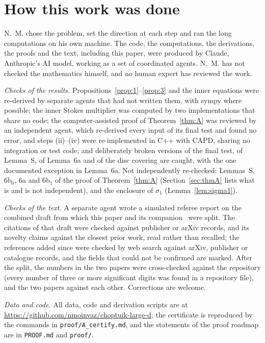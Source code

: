 \documentclass{amsart}
\numberwithin{equation}{section}
\theoremstyle{plain}
\theoremstyle{definition}
\theoremstyle{remark}
\newcommand{\repo}[1]{\texttt{#1}}
\begin{document}
\section*{How this work was done}
\label{sec:how}

N.~M. chose the problem, set the direction at each step and ran the long computations on his own machine. The code, the
computations, the derivations, the proofs and the text, including this paper, were produced by Claude, Anthropic's AI
model, working as a set of coordinated agents. N.~M. has not checked the mathematics himself, and no human expert has
reviewed the work.

\emph{Checks of the results.} Propositions~\ref{prop:1}--\ref{prop:3} and the inner equations were re-derived by separate
agents that had not written them, with sympy where possible; the inner Stokes multiplier was computed by two
implementations that share no code; the computer-assisted proof of Theorem~\ref{thm:A} was reviewed by an independent
agent, which re-derived every input of its final test and found no error, and steps (ii)--(iv) were re-implemented in C++
with CAPD, sharing no integration or test code; and deliberately broken versions of the final test, of Lemma~S, of
Lemma~6a and of the disc covering are caught, with the one documented exception in Lemma~6a. Not independently
re-checked: Lemmas~S, 6b$_0$, 6a and 6b$_1$ of the proof of Theorem~\ref{thm:A} (Section~\ref{sec:thmA} lists what is and is
not independent), and the enclosure of $\sigma_1$ (Lemma~\ref{lem:sigma1}).

\emph{Checks of the text.} A separate agent wrote a simulated referee report on the combined draft from which this paper
and its companion~\cite{companion} were split. The citations of that draft were checked against publisher or arXiv
records, and its novelty claims against the closest prior work, read rather than recalled; the references added since
were checked by web search against arXiv, publisher or catalogue records, and the fields that could not be confirmed are
marked. After the split, the numbers in the two papers were cross-checked against the repository (every number of three
or more significant digits was found in a repository file), and the two papers against each other. Corrections are
welcome.

\emph{Data and code.} All data, code and derivation scripts are at \url{https://github.com/nmoinvaz/choptuik-large-d}; the
certificate is reproduced by the commands in \repo{proof/A\_certify.md}, and the statements of the proof roadmap are in
\repo{PROOF.md} and \repo{proof/}.
\end{document}

